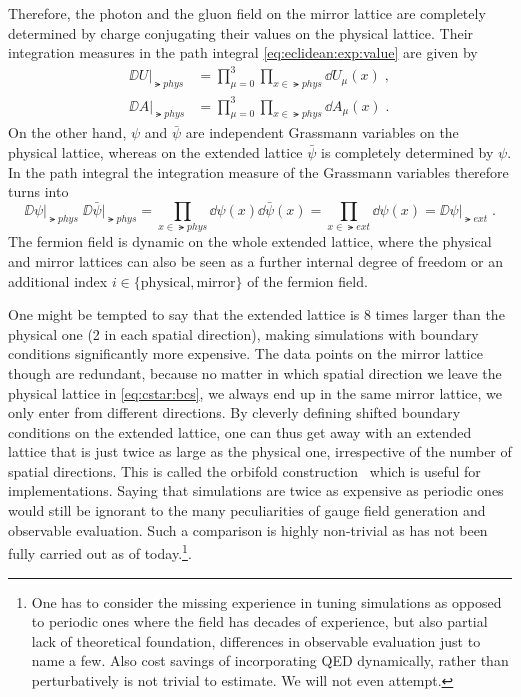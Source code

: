 Therefore, the photon and the gluon field on the mirror lattice are completely determined by charge conjugating their values on the physical lattice.
Their integration measures in the path integral \cref{eq:eclidean:exp:value} are given by
\begin{align}
\DD U \big\rvert_{\lat{phys}} &= \prod_{\mu=0}^{3} \prod_{x \in \lat{phys}} \dd U_{\mu}(x) \;, \\
\DD A \big\rvert_{\lat{phys}} &= \prod_{\mu=0}^{3} \prod_{x \in \lat{phys}} \dd A_{\mu}(x) \;.
\end{align}
On the other hand, $\psi$ and $\bar{\psi}$ are independent Grassmann variables on the physical lattice, whereas on the extended lattice $\bar{\psi}$ is completely determined by $\psi$. In the path integral the integration measure of the Grassmann variables therefore turns into
\begin{equation}
\DD \psi       \big\rvert_{\lat{phys}} \;
\DD \bar{\psi} \big\rvert_{\lat{phys}}
= \prod_{x \in \lat{phys}} \dd \psi(x) \dd \bar{\psi}(x)
= \prod_{x \in \lat{ext}}  \dd \psi(x)
= \DD \psi \big\rvert_{\lat{ext}} \;.
\end{equation}
The fermion field is dynamic on the whole extended lattice, where the physical and mirror lattices can also be seen as a further internal degree of freedom or an additional index $i \in \{ \text{physical}, \text{mirror} \}$ of the fermion field. 

One might be tempted to say that the extended lattice is \num{8} times larger than the physical one (\num{2} in each spatial direction), making simulations with \Cstar boundary conditions significantly more expensive.
The data points on the mirror lattice though are redundant, because no matter in which spatial direction we leave the physical lattice in \cref{eq:cstar:bcs}, we always end up in the same mirror lattice, we only enter from different directions.
By cleverly defining shifted boundary conditions on the extended lattice, one can thus get away with an extended lattice that is just twice as large as the physical one, irrespective of the number of spatial \Cstar directions.
This is called the orbifold construction~\cite{openqxd} which is useful for implementations.
Saying that \Cstar simulations are twice as expensive as periodic ones would still be ignorant to the many peculiarities of gauge field generation and observable evaluation.
Such a comparison is highly non-trivial as has not been fully carried out as of today.\footnote{One has to consider the missing experience in tuning \Cstar simulations as opposed to periodic ones where the field has decades of experience, but also partial lack of theoretical foundation, differences in observable evaluation just to name a few. Also cost savings of incorporating QED dynamically, rather than perturbatively is not trivial to estimate. We will not even attempt.}.

